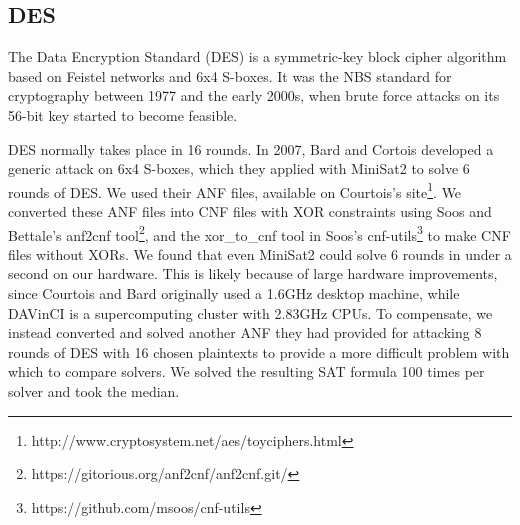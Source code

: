 \subsection{DES}
\label{sec:encoding:des}

The Data Encryption Standard (DES) is a symmetric-key block cipher algorithm based on Feistel networks and 6x4 S-boxes. It was the NBS standard for cryptography between 1977 and the early 2000s, when brute force attacks on its 56-bit key started to become feasible.\cite{Simmons16}

DES normally takes place in 16 rounds. In 2007, Bard and Cortois\cite{CB07} developed a generic attack on 6x4 S-boxes, which they applied with MiniSat2 to solve 6 rounds of DES.  We used their ANF files, available on Courtois's site\footnote{http://www.cryptosystem.net/aes/toyciphers.html}. We converted these ANF files into CNF files with XOR constraints using Soos and Bettale's anf2cnf tool\footnote{https://gitorious.org/anf2cnf/anf2cnf.git/}, and the xor\_to\_cnf tool in Soos's cnf-utils\cite{SNC09}\footnote{https://github.com/msoos/cnf-utils} to make CNF files without XORs. We found that even MiniSat2 could solve 6 rounds in under a second on our hardware. This is likely because of large hardware improvements, since Courtois and Bard originally used a 1.6GHz desktop machine, while DAVinCI is a supercomputing cluster with 2.83GHz CPUs. To compensate, we instead converted and solved another ANF they had provided for attacking 8 rounds of DES with 16 chosen plaintexts to provide a more difficult problem with which to compare solvers. We solved the resulting SAT formula 100 times per solver and took the median.